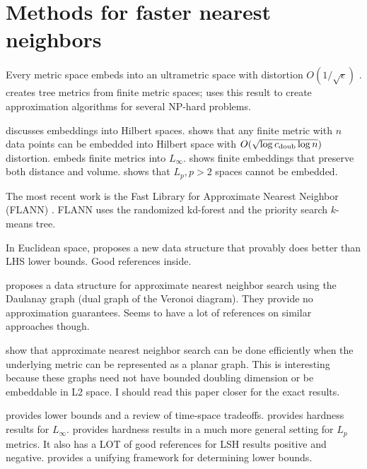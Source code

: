 \documentclass[../main.tex]{subfiles}
\newcommand{\doubnum}{c_\textnormal{doub}}
\begin{document}

\section{Methods for faster nearest neighbors}

Every metric space embeds into an ultrametric space with distortion $O(1/\sqrt \epsilon)$ \citep{abraham2007embedding}.
\cite{charikar1998approximating} creates tree metrics from finite metric spaces;
uses this result to create approximation algorithms for several NP-hard problems.

\cite{bartal2003metric} discusses embeddings into Hilbert spaces.
\cite{krauthgamer2004measured} shows that any finite metric with $n$ data points can be embedded into Hilbert space with $O(\sqrt{\log\doubnum\log n})$ distortion.
\cite{neiman2016low} embeds finite metrics into $L_\infty$.
\cite{abraham2014volume} shows finite embeddings that preserve both distance and volume.
\cite{bartal2015impossibility} shows that $L_p, p>2$ spaces cannot be embedded.

The most recent work is the Fast Library for Approximate Nearest Neighbor (FLANN) \cite{muja2014scalable}.
FLANN uses the randomized kd-forest and the priority search $k$-means tree.

In Euclidean space, \cite{andoni2014beyond} proposes a new data structure that provably does better than LHS lower bounds.
Good references inside.

\cite{malkov2014approximate} proposes a data structure for approximate nearest neighbor search using the Daulanay graph (dual graph of the Veronoi diagram).
They provide no approximation guarantees.
Seems to have a lot of references on similar approaches though.

\cite{abraham2015approximate} show that approximate nearest neighbor search can be done efficiently when the underlying metric can be represented as a planar graph.
This is interesting because these graphs need not have bounded doubling dimension or be embeddable in L2 space.
I should read this paper closer for the exact results.

\cite{borodin1999lower,barkol2000tighter,panigrahy2008geometric} provides lower bounds and a review of time-space tradeoffs.
\cite{andoni2008hardness} provides hardness results for $L_\infty$.
\cite{andoni2016lower} provides hardness results in a much more general setting for $L_p$ metrics.
It also has a LOT of good references for LSH results positive and negative.
\cite{p2011unifying} provides a unifying framework for determining lower bounds.
\end{document}
